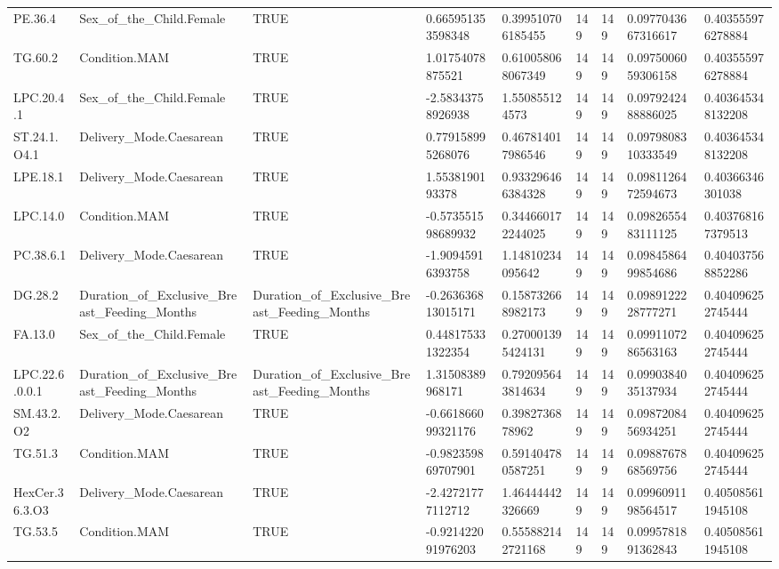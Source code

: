 \begin{longtable}{lllllllll}
PE.36.4 & Sex\_of\_the\_Child.Female & TRUE & 0.665951353598348 & 0.399510706185455 & 149 & 149 & 0.0977043667316617 & 0.403555976278884 \\
TG.60.2 & Condition.MAM & TRUE & 1.01754078875521 & 0.610058068067349 & 149 & 149 & 0.0975006059306158 & 0.403555976278884 \\
LPC.20.4.1 & Sex\_of\_the\_Child.Female & TRUE & -2.58343758926938 & 1.550855124573 & 149 & 149 & 0.0979242488886025 & 0.403645348132208 \\
ST.24.1.O4.1 & Delivery\_Mode.Caesarean & TRUE & 0.779158995268076 & 0.467814017986546 & 149 & 149 & 0.0979808310333549 & 0.403645348132208 \\
LPE.18.1 & Delivery\_Mode.Caesarean & TRUE & 1.5538190193378 & 0.933296466384328 & 149 & 149 & 0.0981126472594673 & 0.40366346301038 \\
LPC.14.0 & Condition.MAM & TRUE & -0.573551598689932 & 0.344660172244025 & 149 & 149 & 0.0982655483111125 & 0.403768167379513 \\
PC.38.6.1 & Delivery\_Mode.Caesarean & TRUE & -1.90945916393758 & 1.14810234095642 & 149 & 149 & 0.0984586499854686 & 0.404037568852286 \\
DG.28.2 & Duration\_of\_Exclusive\_Breast\_Feeding\_Months & Duration\_of\_Exclusive\_Breast\_Feeding\_Months & -0.263636813015171 & 0.158732668982173 & 149 & 149 & 0.0989122228777271 & 0.404096252745444 \\
FA.13.0 & Sex\_of\_the\_Child.Female & TRUE & 0.448175331322354 & 0.270001395424131 & 149 & 149 & 0.0991107286563163 & 0.404096252745444 \\
LPC.22.6.0.0.1 & Duration\_of\_Exclusive\_Breast\_Feeding\_Months & Duration\_of\_Exclusive\_Breast\_Feeding\_Months & 1.31508389968171 & 0.792095643814634 & 149 & 149 & 0.0990384035137934 & 0.404096252745444 \\
SM.43.2.O2 & Delivery\_Mode.Caesarean & TRUE & -0.661866099321176 & 0.3982736878962 & 149 & 149 & 0.0987208456934251 & 0.404096252745444 \\
TG.51.3 & Condition.MAM & TRUE & -0.982359869707901 & 0.591404780587251 & 149 & 149 & 0.0988767868569756 & 0.404096252745444 \\
HexCer.36.3.O3 & Delivery\_Mode.Caesarean & TRUE & -2.42721777112712 & 1.46444442326669 & 149 & 149 & 0.0996091198564517 & 0.405085611945108 \\
TG.53.5 & Condition.MAM & TRUE & -0.921422091976203 & 0.555882142721168 & 149 & 149 & 0.0995781891362843 & 0.405085611945108 \\

\end{longtable}
